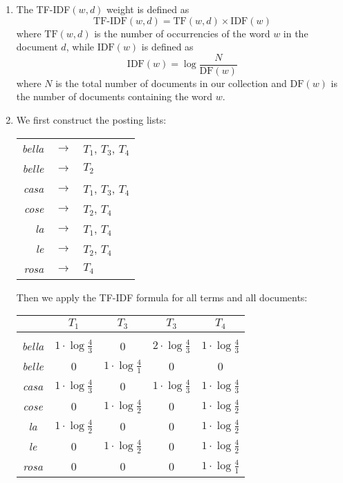 \begin{enumerate}

  \item The TF-IDF$(w, d)$ weight is defined as $$\text{TF-IDF}(w, d) =
  \text{TF}(w, d) \times \text{IDF}(w)$$ where $\text{TF}(w, d)$ is the number
  of occurrencies of the word $w$ in the document $d$, while $\text{IDF}(w)$ is
  defined as $$\text{IDF}(w) = \log \frac{N}{\text{DF}(w)}$$ where $N$ is the
  total number of documents in our collection and $\text{DF}(w)$ is the number
  of documents containing the word $w$.

  \item We first construct the posting lists:
  \begin{longtable}{rcl}
    \emph{bella} & $\rightarrow$ & $T_1$, $T_3$, $T_4$ \\
    \emph{belle} & $\rightarrow$ & $T_2$ \\
    \emph{casa} & $\rightarrow$ & $T_1$, $T_3$, $T_4$ \\
    \emph{cose} & $\rightarrow$ & $T_2$, $T_4$ \\
    \emph{la} & $\rightarrow$ & $T_1$, $T_4$ \\
    \emph{le} & $\rightarrow$ & $T_2$, $T_4$ \\
    \emph{rosa} & $\rightarrow$ & $T_4$ \\
  \end{longtable}
  Then we apply the TF-IDF formula for all terms and all documents:
  \begin{center}
    \begin{tabular}{c|c|c|c|c|}
                   & $T_1$ & $T_3$ & $T_3$ & $T_4$ \\ \hline &&&&\\[-1em]
      \emph{bella} & $1 \cdot\log\frac{4}{3}$ & 0
                   & $2 \cdot\log\frac{4}{3}$ & $1 \cdot\log\frac{4}{3}$\\[3pt]
      \emph{belle} & 0 & $1 \cdot\log\frac{4}{1}$ & 0 & 0 \\[3pt]
      \emph{casa}  & $1 \cdot\log\frac{4}{3}$ & 0
                   & $1 \cdot\log\frac{4}{3}$ & $1 \cdot\log\frac{4}{3}$ \\[3pt]
      \emph{cose}  & 0 & $1 \cdot\log\frac{4}{2}$
                   & 0 & $1 \cdot\log\frac{4}{2}$ \\[3pt]
      \emph{la}    & $1 \cdot\log\frac{4}{2}$ & 0
                   & 0 & $1 \cdot\log\frac{4}{2}$ \\[3pt]
      \emph{le}    & 0 & $1 \cdot\log\frac{4}{2}$
                   & 0 & $1 \cdot\log\frac{4}{2}$ \\[3pt]
      \emph{rosa}  & 0 & 0 & 0 & $1 \cdot\log\frac{4}{1}$ \\[3pt] \hline
    \end{tabular}
  \end{center}


\end{enumerate}
